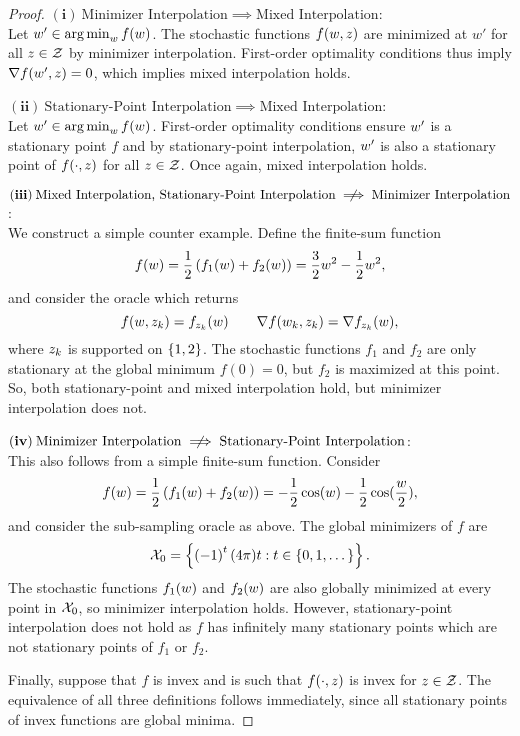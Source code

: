 \interpRelationships*
\begin{proof}\hfill \break
    \noindent \((\mathbf{i})\: \text{Minimizer Interpolation} \implies \text{Mixed Interpolation} \): \\
    Let \( w' \in \mathop{\rm arg\,min}_w f(w) \).
    The stochastic functions \( f(w, z) \) are minimized at \( w'  \) for all \( z \in \mathcal{Z} \) by minimizer interpolation.
    First-order optimality conditions thus imply \( \nabla f(w', z) = 0 \), which implies mixed interpolation holds. \hfill \break

    \noindent \( (\mathbf{ii}) \: \text{Stationary-Point Interpolation} \implies \text{Mixed Interpolation} \): \\
    Let \( w' \in \mathop{\rm arg\,min}_w f(w) \).
    First-order optimality conditions ensure \( w' \) is a stationary point \( f \) and by stationary-point interpolation, \( w' \) is also a stationary point of \( f(\cdot, z) \) for all \( z \in \mathcal{Z} \).
    Once again, mixed interpolation holds.\hfill \break

\noindent    \(  (\mathbf{iii}) \:\text{Mixed Interpolation, Stationary-Point Interpolation} \centernot \implies \text{Minimizer Interpolation} \): \\
    We construct a simple counter example.
    Define the finite-sum function
    \[ f(w) = \frac 1 2 \left(f_1(w) + f_2(w)\right) = \frac{3}{2}w^2 - \frac 1 2w^2, \]
    and consider the oracle \oracle{} which returns
    \[ f(w, z_{k}) = f_{z_{k}}(w) \quad \quad \nabla f(w_k, z_{k}) = \nabla f_{z_{k}}(w), \] 
    where \( z_{k} \) is supported on \( \left\{1,2\right\} \).
    The stochastic functions \( f_1 \) and \( f_2 \) are only stationary at the global minimum \( f(0) = 0 \), but \( f_2 \) is maximized at this point.
    So, both stationary-point and mixed interpolation hold, but minimizer interpolation does not.\hfill \break

\noindent    \( (\mathbf{iv}) \: \text{Minimizer Interpolation} \centernot \implies \text{Stationary-Point Interpolation} \): \\
    This also follows from a simple finite-sum function.
    Consider
    \[ f(w) = \frac 1 2 \left(f_1(w) + f_2(w)\right) = -\frac 1 2 \cos(w) - \frac 1 2 \cos(\frac{w}{2}), \]
    and consider the sub-sampling oracle \oracle{} as above.
    The global minimizers of \( f \) are 
    \[ \mathcal{X}_0 = \left\{\left(-1\right)^{t} (4\pi) t : t \in \left\{0,1, \dots \right\}\right\}. \]
    The stochastic functions \( f_1(w) \) and \( f_2(w) \) are also globally minimized at every point in \( \mathcal{X}_0 \), so minimizer interpolation holds.
    However, stationary-point interpolation does not hold as \( f \) has infinitely many stationary points which are not stationary points of \( f_1 \) or \( f_2 \). \hfill \break

    Finally, suppose that \( f \) is invex and \oracle{} is such that \( f(\cdot, z) \) is invex for \( z \in \mathcal{Z} \).
    The equivalence of all three definitions follows immediately, since all stationary points of invex functions are global minima.
\end{proof}

